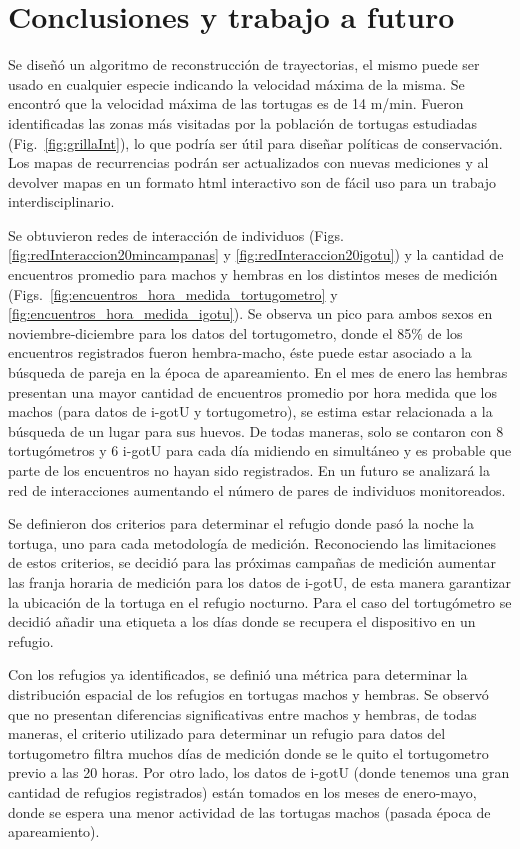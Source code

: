 \chapter{Conclusiones y trabajo a futuro}
 
Se diseñó un algoritmo de reconstrucción de trayectorias, el mismo puede ser usado en cualquier especie indicando la velocidad máxima de la misma. Se encontró que la velocidad máxima de las tortugas es de 14 m/min. Fueron identificadas las zonas más visitadas por la población de tortugas estudiadas (Fig.~\ref{fig:grillaInt}), lo que podría ser útil para diseñar políticas de conservación. Los mapas de recurrencias podrán ser actualizados con nuevas mediciones y al devolver mapas en un formato html interactivo son de fácil uso para un trabajo interdisciplinario.
 
Se obtuvieron redes  de interacción de individuos (Figs. \ref{fig:redInteraccion20mincampanas} y \ref{fig:redInteraccion20igotu}) y la cantidad de encuentros promedio para machos y hembras en los distintos meses de medición (Figs.~\ref{fig:encuentros_hora_medida_tortugometro} y \ref{fig:encuentros_hora_medida_igotu}). Se observa un pico para ambos sexos en noviembre-diciembre para los datos del tortugometro, donde el 85\% de los encuentros registrados fueron hembra-macho, éste puede estar asociado a la búsqueda de pareja en la época de apareamiento. En el mes de enero las hembras presentan una mayor cantidad de encuentros promedio por hora medida que los machos (para datos de i-gotU y tortugometro), se estima estar relacionada a la búsqueda de un lugar para sus huevos. De todas maneras, solo se contaron con 8 tortugómetros y 6 i-gotU  para cada día midiendo en simultáneo y es probable que parte de los encuentros no hayan sido registrados. En un futuro se analizará la red de interacciones aumentando el número de pares de individuos monitoreados.
 
 
Se definieron dos criterios para determinar el refugio donde pasó la noche la tortuga, uno para cada metodología de medición. Reconociendo las limitaciones de estos criterios, se decidió para las próximas campañas de medición aumentar las franja horaria de medición para los datos de i-gotU, de esta manera garantizar la ubicación de la tortuga en el refugio nocturno. Para el caso del tortugómetro se decidió añadir una etiqueta a los días donde se recupera el dispositivo en un refugio.
 
Con los refugios ya identificados, se definió una métrica para determinar la distribución espacial de los refugios en tortugas machos y hembras. Se observó que no presentan diferencias significativas entre machos y hembras, de todas maneras, el criterio utilizado para determinar un refugio para datos del tortugometro filtra muchos días de medición donde se le quito el tortugometro previo a las 20 horas. Por otro lado, los datos de i-gotU (donde tenemos una gran cantidad de refugios registrados) están tomados en los meses de enero-mayo, donde se espera una menor actividad de las tortugas machos (pasada época de apareamiento)\cite{Erika}.
 

